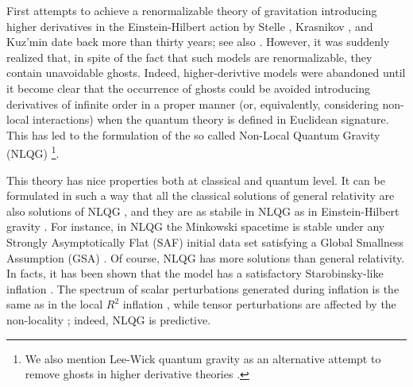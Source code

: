 \documentclass[a4paper,11pt]{article}
\begin{document}
First attempts to achieve a renormalizable theory of gravitation introducing higher derivatives in the Einstein-Hilbert action by Stelle \cite{Stelle}, Krasnikov  \cite{Krasnikov}, and Kuz'min \cite{Kuzmin} date back more than thirty years; see also \cite{FT1,FT2,FT3,FT4,FT5,FT6}. However, it was suddenly realized that, in spite of the fact that such models are renormalizable, they contain unavoidable ghosts. Indeed, higher-derivtive models were abandoned  until it become clear that the occurrence of ghosts could be avoided introducing derivatives of infinite order in a proper manner (or, equivalently, considering non-local interactions) when the quantum theory is defined in Euclidean signature. This has led to the formulation of the so called Non-Local Quantum Gravity (NLQG) \cite{Modesto,Review,ModestoLeslaw,briscese1,briscese2,Buoninfante,Buoninfante2,nonlocal1,nonlocal2,nonlocal3,nonlocal4,nonlocal5,nonlocal6,nonlocal7,nonlocal8,nonlocal9,transplanck,inflation1,inflation2,inflation3,inflation4,inflation5,unitarity1,unitarity2,unitarity3,Yao-dong,nonlocaldesitter,Stability2,Stability1,dona,causality,boos1,boos2,boos3,FT7,FT8,FT9,FT10,FT11,FT12,FT13,FT14}\footnote{We also mention   Lee-Wick quantum gravity as an alternative attempt to remove ghosts in higher derivative theories \cite{HigherDG,Modesto:2015ozb,Modesto:2016ofr,shapiromodesto,LWqg,anselmi,mannheim}.}.

This theory has nice properties both at classical and quantum level. It can be formulated in such a way that all the classical solutions of general relativity  are also solutions of NLQG \cite{Yao-dong}, and  they are as stabile in NLQG as in   Einstein-Hilbert gravity \cite{Stability1,Stability2,nonlocaldesitter}. 
For instance, in NLQG the Minkowski spacetime is stable under any Strongly Asymptotically Flat (SAF) initial data set satisfying a Global Smallness Assumption (GSA) \cite{Stability1}. Of course, NLQG has more solutions than general relativity. In facts, it has been shown that the model has a satisfactory Starobinsky-like inflation \cite{inflation1,inflation2}. The spectrum of scalar perturbations generated during inflation is the same as in the local $R^2$ inflation \cite{Starobinsky}, while  tensor perturbations are affected by the non-locality \cite{inflation3,inflation4,inflation5}; indeed, NLQG is predictive. 
\end{document}
